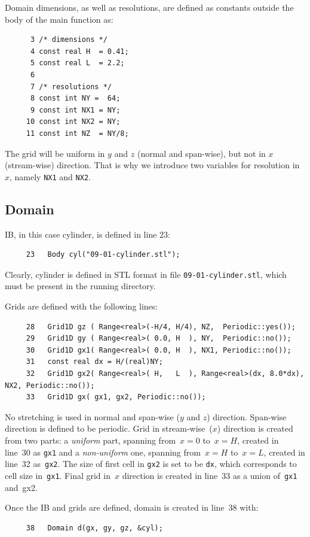 Domain dimensions, as well as resolutions, are defined as constants outside
the body of the main function as:
%
{\small \begin{verbatim}
      3 /* dimensions */
      4 const real H  = 0.41;
      5 const real L  = 2.2;
      6
      7 /* resolutions */
      8 const int NY =  64;
      9 const int NX1 = NY;
     10 const int NX2 = NY;
     11 const int NZ  = NY/8;
\end{verbatim}}
%
The grid will be uniform in $y$ and $z$ (normal and span-wise), but
not in $x$ (stream-wise) direction. That is why we introduce two variables
for resolution in $x$, namely {\tt NX1} and {\tt NX2}.

\subsection{Domain}

IB, in this case cylinder, is defined in line 23:
%
{\small \begin{verbatim}
     23   Body cyl("09-01-cylinder.stl");
\end{verbatim}}
%
Clearly, cylinder is defined in STL format in file {\tt 09-01-cylinder.stl}, 
which must be present in the running directory. 

Grids are defined with the following lines:
%
{\small \begin{verbatim}
     28   Grid1D gz ( Range<real>(-H/4, H/4), NZ,  Periodic::yes());
     29   Grid1D gy ( Range<real>( 0.0, H  ), NY,  Periodic::no());
     30   Grid1D gx1( Range<real>( 0.0, H  ), NX1, Periodic::no());
     31   const real dx = H/(real)NY;
     32   Grid1D gx2( Range<real>( H,   L  ), Range<real>(dx, 8.0*dx), NX2, Periodic::no());
     33   Grid1D gx( gx1, gx2, Periodic::no());
\end{verbatim}}
%
No stretching is used in normal and span-wise ($y$ and $z$) direction. 
Span-wise direction is defined to be periodic. Grid in stream-wise~($x$)
direction is created from two parts: a {\em uniform} part, spanning 
from~$x=0$ to~$x=H$, created in line~30 as {\tt gx1} and a {\em non-uniform} 
one, spanning from~$x=H$ to~$x=L$, created in line~32 as~{\tt gx2}. 
The size of first cell in {\tt gx2} is set to be {\tt dx}, which corresponds
to cell size in~{\tt gx1}. Final grid in~$x$ direction is created in line~33
as a union of~{\tt gx1} and~{gx2}.

Once the IB and grids are defined, domain is created in line~38
with:
%
{\small \begin{verbatim}
     38   Domain d(gx, gy, gz, &cyl);
\end{verbatim}}

